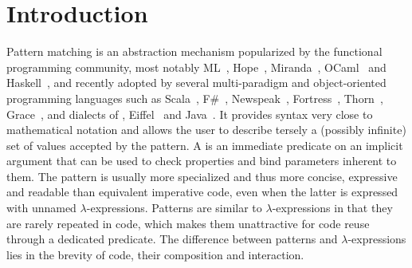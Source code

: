 \section{Introduction} %
\label{sec:intro}


Pattern matching is an abstraction mechanism popularized by the functional
programming community, most notably ML~\cite{ML78}, Hope~\cite{BMS80}, 
Miranda~\cite{Miranda85}, OCaml~\cite{OPM01} and Haskell~\cite{haskell90},
and recently adopted by several multi-paradigm and object-oriented programming 
languages such as Scala~\cite{Scala2nd}, F\#~\cite{Syme07}, 
Newspeak~\cite{geller2010pattern}, Fortress~\cite{RPS10}, 
Thorn~\cite{Thorn2012}, Grace~\cite{Grace2012}, and dialects of 
\Cpp{}\cite{Prop96,App}, Eiffel~\cite{Moreau:2003} and 
Java~\cite{Odersky97pizzainto,Liu03jmatch:iterable,HydroJ2003,OOMatch07thesis,padl08}.
It provides syntax very close to mathematical notation and allows the user to 
describe tersely a (possibly infinite) set of values accepted by the pattern. 
A  is an immediate predicate on an implicit argument that can be 
used to check properties and bind parameters inherent to them. The pattern is 
usually more specialized and thus more concise, expressive and readable than 
equivalent imperative code, even when the latter is expressed with unnamed 
$\lambda$-expressions. Patterns are similar to $\lambda$-expressions in 
that they are rarely repeated in code, which makes them 
unattractive for code reuse through a dedicated predicate. The difference 
between patterns and $\lambda$-expressions lies in the brevity of code, their 
composition and interaction.

